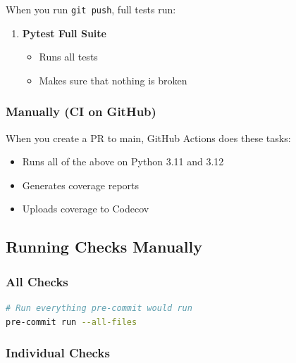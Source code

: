 When you run \texttt{git\ push}, full tests run:

\begin{enumerate}
\def\labelenumi{\arabic{enumi}.}
\setcounter{enumi}{6}
\tightlist
\item
  \textbf{Pytest Full Suite}

  \begin{itemize}
  \tightlist
  \item
    Runs all tests
  \item
    Makes sure that nothing is broken
  \end{itemize}
\end{enumerate}

\subsubsection{Manually (CI on GitHub)}\label{um:guide:local-qa:manually-ci-on-github}

When you create a PR to main, GitHub Actions does these tasks:

\begin{itemize}
\tightlist
\item
  Runs all of the above on Python 3.11 and 3.12
\item
  Generates coverage reports
\item
  Uploads coverage to Codecov
\end{itemize}

\subsection{Running Checks Manually}\label{um:guide:local-qa:running-checks-manually}

\subsubsection{All Checks}\label{um:guide:local-qa:all-checks}

\begin{lstlisting}[language=bash]
# Run everything pre-commit would run
pre-commit run --all-files
\end{lstlisting}

\subsubsection{Individual Checks}\label{um:guide:local-qa:individual-checks}

